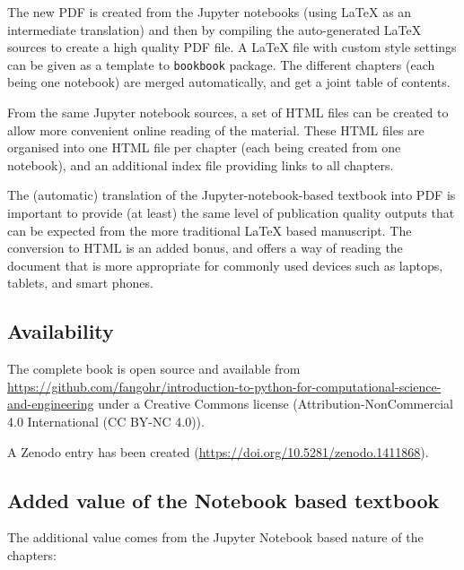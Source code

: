 \documentclass{deliverablereport}
\begin{document}
The new PDF is created from the Jupyter notebooks (using \LaTeX{} as
an intermediate translation) and then by compiling the auto-generated
\LaTeX{} sources to create a high quality PDF file. A \LaTeX{} file
with custom style settings can be given as a template to
\texttt{bookbook} package. The different chapters (each being one
notebook) are merged automatically, and get a joint table of contents.

From the same Jupyter notebook sources, a set of HTML files can be
created to allow more convenient online reading of the material. These
HTML files are organised into one HTML file per chapter (each being
created from one notebook), and an additional index file providing
links to all chapters.

The (automatic) translation of the Jupyter-notebook-based textbook
into PDF is important to provide (at least) the same level of
publication quality outputs that can be expected from the more
traditional \LaTeX{} based manuscript. The conversion to HTML is an
added bonus, and offers a way of reading the document that is more
appropriate for commonly used devices such as laptops, tablets, and
smart phones.

\subsection{Availability}

The complete book is open source and available from\newline
{\tiny\url{https://github.com/fangohr/introduction-to-python-for-computational-science-and-engineering}}\linebreak
under a Creative Commons license (Attribution-NonCommercial 4.0
International (CC BY-NC 4.0)).

A Zenodo entry has been created (\url{https://doi.org/10.5281/zenodo.1411868}).

\subsection{Added value of the Notebook based textbook}

The additional value comes from the Jupyter Notebook based
nature of the chapters:
\end{document}
